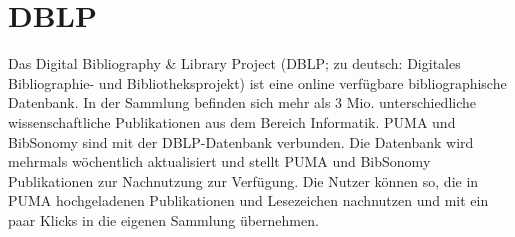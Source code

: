\section{DBLP}
Das Digital Bibliography \& Library Project (DBLP; zu deutsch: Digitales Bibliographie- und Bibliotheksprojekt) ist eine online verfügbare bibliographische Datenbank. In der Sammlung befinden sich mehr als 3 Mio. unterschiedliche wissenschaftliche Publikationen aus dem Bereich Informatik.\newline
PUMA und BibSonomy sind mit der DBLP-Datenbank verbunden. Die Datenbank wird mehrmals wöchentlich aktualisiert und stellt PUMA und BibSonomy Publikationen zur Nachnutzung zur Verfügung. \newline
Die Nutzer können so, die in PUMA hochgeladenen Publikationen und Lesezeichen nachnutzen und mit ein paar Klicks in die eigenen Sammlung übernehmen. 
